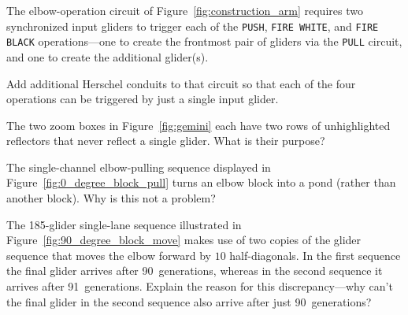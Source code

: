 \vspace*{-0.4cm}\hrulefill\vspace*{-0.3cm}\footnotesize\begin{multicols}{2}\vspace*{-0.4cm}\raggedcolumns{}
\setlength{\parskip}{0pt}


\begin{problem}\label{exer:construction_arm_lanes_timed}
	The elbow-operation circuit of Figure~\ref{fig:construction_arm} requires two synchronized input gliders to trigger each of the \texttt{PUSH}, \texttt{FIRE WHITE}, and \texttt{FIRE BLACK} operations---one to create the frontmost pair of gliders via the \texttt{PULL} circuit, and one to create the additional glider(s).
	
	\noindent Add additional Herschel conduits to that circuit so that each of the four operations can be triggered by just a single input glider.
\end{problem}


\mfilbreak


\begin{problemstar}\label{exer:gemini_unhighlighted_reflectors}
	The two zoom boxes in Figure~\ref{fig:gemini} each have two rows of unhighlighted reflectors that never reflect a single glider. What is their purpose?
\end{problemstar}


\mfilbreak


\begin{problem}\label{exer:block_pull_pond}
	The single-channel elbow-pulling sequence displayed in Figure~\ref{fig:0_degree_block_pull} turns an elbow block into a pond (rather than another block). Why is this not a problem?
\end{problem}


\mfilbreak


\begin{problemstar}\label{exer:single_lane_glider_final_glider_explain}
	The 185-glider single-lane sequence illustrated in Figure~\ref{fig:90_degree_block_move} makes use of two copies of the glider sequence that moves the elbow forward by $10$ half-diagonals. In the first sequence the final glider arrives after 90~generations, whereas in the second sequence it arrives after 91~generations. Explain the reason for this discrepancy---why can't the final glider in the second sequence also arrive after just 90~generations?
\end{problemstar}



\end{multicols}
